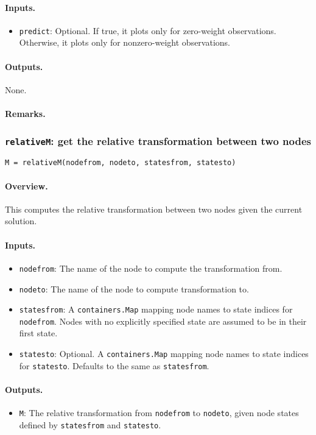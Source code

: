 \paragraph{Inputs.}
\begin{itemize}
	\item \texttt{predict}: Optional. If true, it plots only for zero-weight 
		observations. Otherwise, it plots only for nonzero-weight observations.
\end{itemize}
\paragraph{Outputs.} None.
\paragraph{Remarks.}

\subsubsection{\texttt{relativeM}: get the relative transformation between two nodes}
\texttt{M = relativeM(nodefrom, nodeto, statesfrom, statesto)}
\paragraph{Overview.}
This computes the relative transformation between two nodes given the current solution.
\paragraph{Inputs.}
\begin{itemize}
	\item \texttt{nodefrom}: The name of the node to compute the transformation from.
	\item \texttt{nodeto}: The name of the node to compute transformation to.
	\item \texttt{statesfrom}: A \texttt{containers.Map} mapping node names to state indices for \texttt{nodefrom}.
		Nodes with no explicitly specified state are assumed to be in their first state.
	\item \texttt{statesto}: Optional. A \texttt{containers.Map} mapping node names to state indices for \texttt{statesto}.
        Defaults to the same as \texttt{statesfrom}.
\end{itemize}
\paragraph{Outputs.}
\begin{itemize}
	\item \texttt{M}: The relative transformation from \texttt{nodefrom} to \texttt{nodeto},
		given node states defined by \texttt{statesfrom} and \texttt{statesto}.
\end{itemize}
